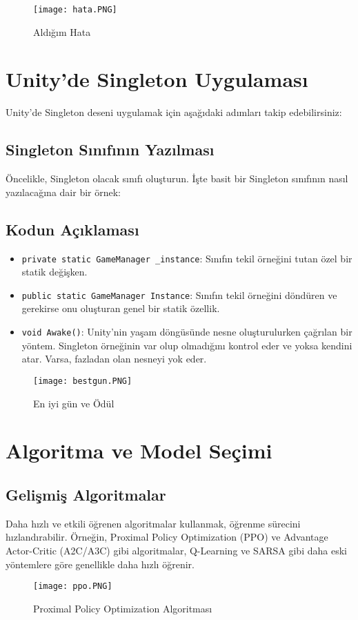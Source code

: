 \documentclass{article}
\begin{document}
\begin{figure}[h]
    \centering
    \texttt{[image: hata.PNG]}
    \caption{Aldığım Hata }
    \label{fig:resim24}
    \end{figure}
\section{Unity'de Singleton Uygulaması}
Unity'de Singleton deseni uygulamak için aşağıdaki adımları takip edebilirsiniz:

\subsection{Singleton Sınıfının Yazılması}

Öncelikle, Singleton olacak sınıfı oluşturun. İşte basit bir Singleton sınıfının nasıl yazılacağına dair bir örnek:



\subsection{Kodun Açıklaması}
\begin{itemize}
    \item \texttt{private static GameManager \_instance}: Sınıfın tekil örneğini tutan özel bir statik değişken.
    \item \texttt{public static GameManager Instance}: Sınıfın tekil örneğini döndüren ve gerekirse onu oluşturan genel bir statik özellik.
    \item \texttt{void Awake()}: Unity'nin yaşam döngüsünde nesne oluşturulurken çağrılan bir yöntem. Singleton örneğinin var olup olmadığını kontrol eder ve yoksa kendini atar. Varsa, fazladan olan nesneyi yok eder.
\end{itemize}
\begin{figure}[h]
    \centering
    \texttt{[image: bestgun.PNG]}
    \caption{En iyi gün ve Ödül }
    \label{fig:resim25}
    \end{figure}
\newpage
\section{Algoritma ve Model Seçimi}
\subsection{Gelişmiş Algoritmalar}
Daha hızlı ve etkili öğrenen algoritmalar kullanmak, öğrenme sürecini hızlandırabilir. Örneğin, Proximal Policy Optimization (PPO) ve Advantage Actor-Critic (A2C/A3C) gibi algoritmalar, Q-Learning ve SARSA gibi daha eski yöntemlere göre genellikle daha hızlı öğrenir.
\begin{figure}[h]
    \centering
    \texttt{[image: ppo.PNG]}
    \caption{Proximal Policy Optimization Algoritması}
    \label{fig:resim26}
    \end{figure}
    \clearpage
\end{document}
